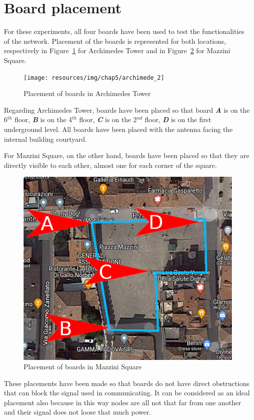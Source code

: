 	\section{Board placement}
	
		For these experiments, all four boards have been used to test the functionalities of the network.
		Placement of the boards is represented for both locations, respectively in Figure~\ref{img:archimede_2} for Archimedes Tower and in Figure~\ref{img:pzza_mazzini_2} for Mazzini Square.
		
		\begin{figure}[h]
			\centering
			\texttt{[image: resources/img/chap5/archimede\_2]}
			\caption{Placement of boards in Archimedes Tower}
			\label{img:archimede_2}
		\end{figure}
	
		Regarding Archimedes Tower, boards have been placed so that board \textbf{\textit{A}} is on the 6$^{th}$ floor, \textbf{\textit{B}} is on the 4$^{th}$ floor, \textbf{\textit{C}} is on the 2$^{nd}$ floor, \textbf{\textit{D}} is on the first underground level.
		All boards have been placed with the antenna facing the internal building courtyard.
		
		For Mazzini Square, on the other hand, boards have been placed so that they are directly visible to each other, almost one for each corner of the square.
		
		\begin{figure}[h]
			\centering
			\includegraphics[width=.6\textwidth]{resources/img/chap5/pzza_mazzini_3}
			\caption{Placement of boards in Mazzini Square}
			\label{img:pzza_mazzini_2}
		\end{figure}
	
		These placements have been made so that boards do not have direct obstructions that can block the signal used in communicating.
		It can be considered as an ideal placement also because in this way nodes are all not that far from one another and their signal does not loose that much power.
		
